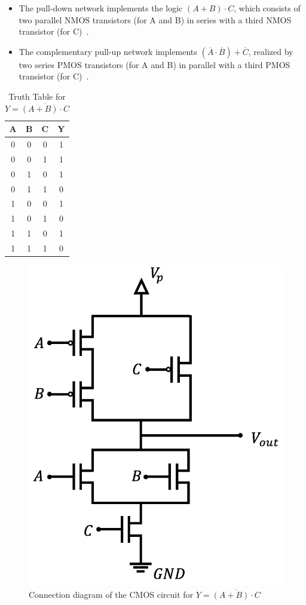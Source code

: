 \documentclass[12pt]{article}
\begin{document}
\begin{itemize}
  \item The pull-down network implements the logic \((A+B)\cdot C\), which consists of two parallel NMOS transistors (for A and B) in series with a third NMOS transistor (for C)~\cite{RabaeyDigitalIC}.
  \item The complementary pull-up network implements \((\overline{A}\cdot \overline{B})+\overline{C}\), realized by two series PMOS transistors (for A and B) in parallel with a third PMOS transistor (for C)~\cite{WesteHarrisCMOS}.
\end{itemize}

\begin{multicols}{2}
  \begin{table}[H]
    \centering

    \begin{tabular}{|c|c|c|c|}
      \hline
      A & B & C & Y \\
      \hline
      0 & 0 & 0 & 1 \\
      0 & 0 & 1 & 1 \\
      0 & 1 & 0 & 1 \\
      0 & 1 & 1 & 0 \\
      1 & 0 & 0 & 1 \\
      1 & 0 & 1 & 0 \\
      1 & 1 & 0 & 1 \\
      1 & 1 & 1 & 0 \\
      \hline
    \end{tabular}
    \caption{Truth Table for \( Y = \overline{(A + B) \cdot C} \)}
  \end{table}

  \begin{figure}[H]
    \centering
    \includegraphics[width=.3\textwidth]{ck1.png}
    \caption{Connection diagram of the CMOS circuit for \( Y = \overline{(A + B) \cdot C} \)}
  \end{figure}
\end{multicols}
\end{document}
